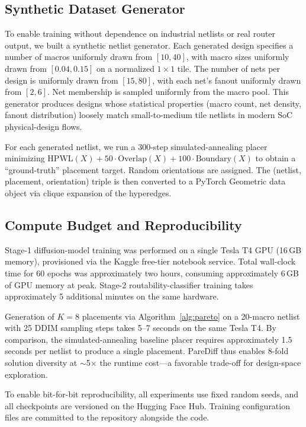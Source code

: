 \documentclass[lettersize,journal]{IEEEtran}
\begin{document}
\subsection{Synthetic Dataset Generator}

To enable training without dependence on industrial netlists or real router output, we built a synthetic netlist generator. Each generated design specifies a number of macros uniformly drawn from $[10, 40]$, with macro sizes uniformly drawn from $[0.04, 0.15]$ on a normalized $1 \times 1$ tile. The number of nets per design is uniformly drawn from $[15, 80]$, with each net's fanout uniformly drawn from $[2, 6]$. Net membership is sampled uniformly from the macro pool. This generator produces designs whose statistical properties (macro count, net density, fanout distribution) loosely match small-to-medium tile netlists in modern SoC physical-design flows.

For each generated netlist, we run a 300-step simulated-annealing placer minimizing $\text{HPWL}(X) + 50 \cdot \text{Overlap}(X) + 100 \cdot \text{Boundary}(X)$ to obtain a ``ground-truth'' placement target. Random orientations are assigned. The (netlist, placement, orientation) triple is then converted to a PyTorch Geometric data object via clique expansion of the hyperedges.

\subsection{Compute Budget and Reproducibility}

Stage-1 diffusion-model training was performed on a single Tesla T4 GPU (16\,GB memory), provisioned via the Kaggle free-tier notebook service. Total wall-clock time for 60 epochs was approximately two hours, consuming approximately 6\,GB of GPU memory at peak. Stage-2 routability-classifier training takes approximately 5 additional minutes on the same hardware.

Generation of $K = 8$ placements via Algorithm~\ref{alg:pareto} on a 20-macro netlist with 25 DDIM sampling steps takes 5--7 seconds on the same Tesla T4. By comparison, the simulated-annealing baseline placer requires approximately 1.5 seconds per netlist to produce a single placement. PareDiff thus enables 8-fold solution diversity at $\sim$5$\times$ the runtime cost---a favorable trade-off for design-space exploration.

To enable bit-for-bit reproducibility, all experiments use fixed random seeds, and all checkpoints are versioned on the Hugging Face Hub. Training configuration files are committed to the repository alongside the code.
\end{document}
